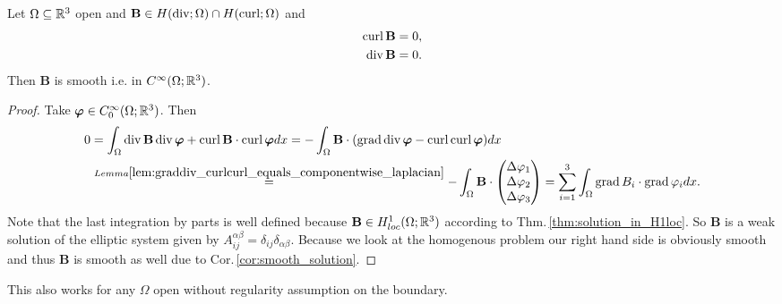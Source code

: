 \documentclass[../main.tex]{subfiles}
\begin{document}
\begin{theorem}\label{thm:smoothness_of_solutions}
    Let $\Omega \subseteq \mathbb{R}^3$ open and 
    $\mathbf{B} \in H(\operatorname{div};\Omega) \cap H(\operatorname{curl};\Omega)$ and 
    \begin{align*}
        \operatorname{curl} \mathbf{B} &= 0,
        \\ \operatorname{div} \mathbf{B} &= 0.
    \end{align*}
    Then $\mathbf{B}$ is smooth i.e. in $C^\infty(\Omega;\mathbb{R}^3)$.
\end{theorem}
\begin{proof}
    Take $\bm{\varphi} \in C_0^\infty(\Omega;\mathbb{R}^3)$. Then 
    \begin{align*}
        0 &= \int_\Omega \operatorname{div} \mathbf{B} \operatorname{div} \bm{\varphi} + \operatorname{curl} \mathbf{B} \cdot \operatorname{curl} \bm{\varphi} dx
        = - \int_\Omega \mathbf{B} \cdot (\operatorname{grad} \operatorname{div} \bm{\varphi} - \operatorname{curl} \operatorname{curl} \bm{\varphi}) dx
        \\ &\stackrel{Lemma 
            \ref{lem:graddiv_curlcurl_equals_componentwise_laplacian}}{=} 
            - \int_\Omega \mathbf{B} \cdot 
            \begin{pmatrix}
                \Delta \varphi_1 \\ \Delta \varphi_2 \\ \Delta \varphi_3
            \end{pmatrix}
        = \sum\limits_{i=1}^3 \int_\Omega \operatorname{grad} B_i \cdot \operatorname{grad} \varphi_i dx.
    \end{align*}
    Note that the last integration by parts is well defined because 
    $\mathbf{B} \in H^1_{loc}(\Omega;\mathbb{R}^3)$ according to Thm.\,\ref{thm:solution_in_H1loc}. 
    So $\mathbf{B}$ is a weak solution 
    of the elliptic system given by 
    $A_{ij}^{\alpha \beta} = \delta_{ij} \delta_{\alpha\beta}$. Because 
    we look at the homogenous problem our right hand side is obviously smooth 
    and thus $\mathbf{B}$ is smooth as well due to Cor.\,\ref{cor:smooth_solution}.
\end{proof}

\begin{remark}
    This also works for any $\Omega$ open without regularity assumption on the boundary.
\end{remark}

\end{document}
